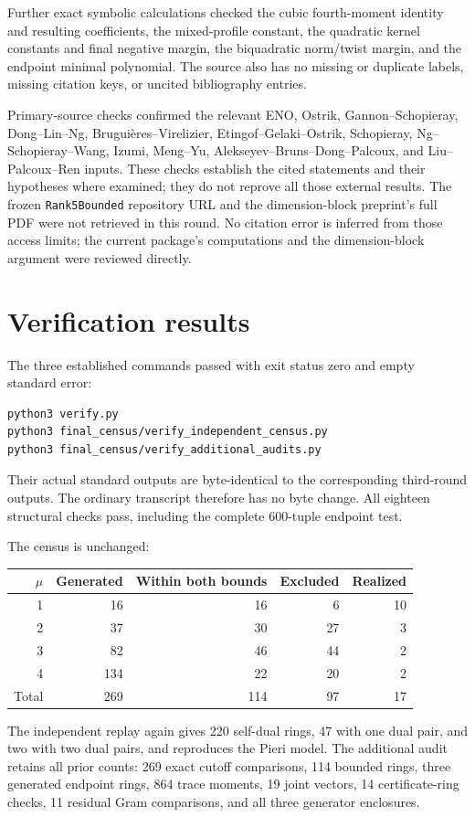 \documentclass[11pt,a4paper]{article}
\begin{document}
Further exact symbolic calculations checked the cubic fourth-moment
identity and resulting coefficients, the mixed-profile constant,
the quadratic kernel constants and final negative margin, the
biquadratic norm/twist margin, and the endpoint minimal polynomial.
The source also has no missing or duplicate labels, missing citation
keys, or uncited bibliography entries.

Primary-source checks confirmed the relevant ENO, Ostrik,
Gannon--Schopieray, Dong--Lin--Ng, Brugui\`eres--Virelizier,
Etingof--Gelaki--Ostrik, Schopieray, Ng--Schopieray--Wang,
Izumi, Meng--Yu, Alekseyev--Bruns--Dong--Palcoux, and
Liu--Palcoux--Ren inputs. These checks establish the cited statements
and their hypotheses where examined; they do not reprove all those
external results. The frozen \texttt{Rank5Bounded} repository URL
and the dimension-block preprint's full PDF were not retrieved in
this round. No citation error is inferred from those access limits;
the current package's computations and the dimension-block argument
were reviewed directly.

\section{Verification results}

The three established commands passed with exit status zero and
empty standard error:
\begin{verbatim}
python3 verify.py
python3 final_census/verify_independent_census.py
python3 final_census/verify_additional_audits.py
\end{verbatim}
Their actual standard outputs are byte-identical to the corresponding
third-round outputs. The ordinary transcript 
therefore has no byte change. All eighteen structural checks pass,
including the complete 600-tuple endpoint test.

\begin{samepage}
The census is unchanged:
\begin{center}
\begin{tabular}{rrrrr}
\toprule
$\mu$&Generated&Within both bounds&Excluded&Realized\\\midrule
1&16&16&6&10\\
2&37&30&27&3\\
3&82&46&44&2\\
4&134&22&20&2\\\midrule
Total&269&114&97&17\\\bottomrule
\end{tabular}
\end{center}
\end{samepage}
The independent replay again gives 220 self-dual rings, 47 with one
dual pair, and two with two dual pairs, and reproduces the Pieri model.
The additional audit retains all prior counts: 269 exact cutoff
comparisons, 114 bounded rings, three generated endpoint rings,
864 trace moments, 19 joint vectors, 14 certificate-ring checks,
11 residual Gram comparisons, and all three generator enclosures.
\end{document}

